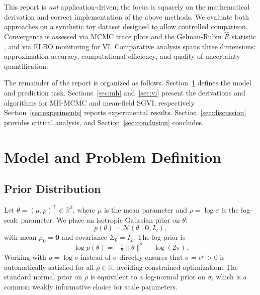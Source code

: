 \documentclass[12pt,a4paper]{article}
\newcommand{\N}{\mathcal{N}}
\newcommand{\R}{\mathbb{R}}
\begin{document}
This report is \emph{not} application-driven; the focus is squarely on
the mathematical derivation and correct implementation of the above methods.
We evaluate both approaches on a synthetic toy dataset designed to allow
controlled comparison.
Convergence is assessed via MCMC trace plots and the Gelman-Rubin
$\hat{R}$ statistic \citep{gelman1992inference}, and via ELBO monitoring
for VI.
Comparative analysis spans three dimensions: approximation accuracy,
computational efficiency, and quality of uncertainty quantification.

The remainder of the report is organized as follows.
Section~\ref{sec:model} defines the model and prediction task.
Sections~\ref{sec:mh} and~\ref{sec:vi} present the derivations and
algorithms for MH-MCMC and mean-field SGVI, respectively.
Section~\ref{sec:experiments} reports experimental results.
Section~\ref{sec:discussion} provides critical analysis, and
Section~\ref{sec:conclusion} concludes.

\section{Model and Problem Definition}
\label{sec:model}

\subsection{Prior Distribution}

Let $\theta = (\mu, \rho)^{\top} \in \R^2$, where $\mu$ is the mean
parameter and $\rho = \log \sigma$ is the log-scale parameter.
We place an isotropic Gaussian prior on $\theta$:
\begin{equation}
  p(\theta) = \N(\theta \mid \mathbf{0}, I_2),
  \label{eq:prior}
\end{equation}
with mean $\mu_0 = \mathbf{0}$ and covariance $\Sigma_0 = I_2$.
The log-prior is
\begin{equation}
  \log p(\theta) = -\tfrac{1}{2}\|\theta\|^2 - \log(2\pi).
  \label{eq:log_prior}
\end{equation}
Working with $\rho = \log \sigma$ instead of $\sigma$ directly ensures
that $\sigma = e^{\rho} > 0$ is automatically satisfied
for all $\rho \in \R$, avoiding constrained optimization.
The standard normal prior on $\rho$ is equivalent to a log-normal prior
on $\sigma$, which is a common weakly informative choice for scale parameters.
\end{document}
